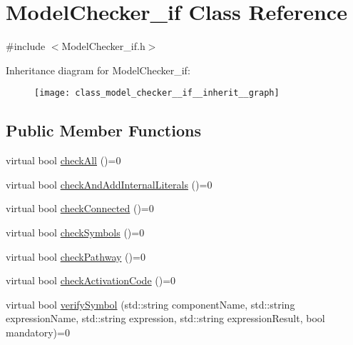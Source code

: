 \hypertarget{class_model_checker__if}{\section{Model\-Checker\-\_\-if Class Reference}
\label{class_model_checker__if}
}


{\ttfamily \#include $<$Model\-Checker\-\_\-if.\-h$>$}



Inheritance diagram for Model\-Checker\-\_\-if\-:\nopagebreak
\begin{figure}[H]
\begin{center}
\leavevmode
\texttt{[image: class\_model\_checker\_\_if\_\_inherit\_\_graph]}
\end{center}
\end{figure}
\subsection*{Public Member Functions}
\begin{DoxyCompactItemize}
\item 
virtual bool \hyperlink{class_model_checker__if_a83bc988696c49a17e0e7668e24743251}{check\-All} ()=0
\item 
virtual bool \hyperlink{class_model_checker__if_a22989b69e688a96fd200e740d33181a5}{check\-And\-Add\-Internal\-Literals} ()=0
\item 
virtual bool \hyperlink{class_model_checker__if_a0d527f054d705b5527bb6521e51c34a7}{check\-Connected} ()=0
\item 
virtual bool \hyperlink{class_model_checker__if_a92ab650708e675a1818b41fe4eb93a59}{check\-Symbols} ()=0
\item 
virtual bool \hyperlink{class_model_checker__if_a1d1e71dcfd02500cf2a844a62395ac36}{check\-Pathway} ()=0
\item 
virtual bool \hyperlink{class_model_checker__if_af5be5d01ea1c549eee6b94907f5ccb74}{check\-Activation\-Code} ()=0
\item 
virtual bool \hyperlink{class_model_checker__if_a36eada12fe9753f5c89099c572e27426}{verify\-Symbol} (std\-::string component\-Name, std\-::string expression\-Name, std\-::string expression, std\-::string expression\-Result, bool mandatory)=0
\end{DoxyCompactItemize}


